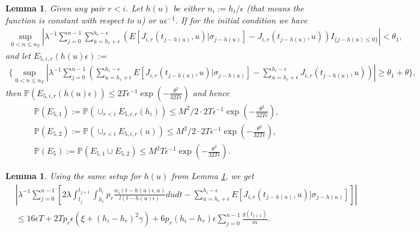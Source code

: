 \documentclass[12pt]{article}
\def\P{\mathbb{P}}
\numberwithin{equation}{section}  %
\newtheorem{lem}[thm]{Lemma}
\begin{document}
\begin{lem}\label{k_dw1} %
Given any pair $r<i$. Let $h(u)$ be either $n_i:=h_i/\epsilon$ (that means the function is constant with respect to $u$) or $u\epsilon^{-1}$.
If for the initial condition we have 
\begin{align}
\sup_{0<n\leq n_T}\left|\lambda^{-1}\sum_{j=0}^{n-1}
\sum_{u=h_r+\epsilon}^{h_i-\epsilon}\left(E[J_{i,r}(t_{j-h(u)},u)|\sigma_{j-h(u)}]
-J_{i,r}(t_{j-h(u)},u)
\right)I_{\{j-h(u)\leq 0\}}
\right|
<\theta_1 \label{kchoice_ini_eq4},
\end{align}
and let 
$E_{5,i,r}(h(u)\epsilon):=$
{\footnotesize
\begin{align*}
\Bigg\{\sup_{0<n\leq n_T}\left|\lambda^{-1}\sum_{j=0}^{n-1}\left(
\sum_{u=h_r+\epsilon}^{h_i-\epsilon}E[J_{i,r}(t_{j-h(u)},u)|\sigma_{j-h(u)}]
-\sum_{u=h_r+\epsilon}^{h_i-\epsilon}J_{i,r}(t_{j-h(u)},u)
\right)
\right|
\geq\theta_1+\theta\Bigg\},
\end{align*} }
then $\P(E_{5,i,r}(h(u)\epsilon))\leq 2T\epsilon^{-1}\exp\left(-\frac{\theta^2}{32T\epsilon}\right)$ and hence
{\footnotesize
\begin{align*} 
\P(E_{5,1}):=\P(\cup_{r<i}E_{5,i,r}(h_i))
\leq M^2/2\cdot2T\epsilon^{-1}\exp\left(-\frac{\theta^2}{32T\epsilon}\right),\\
\P(E_{5,2}):=\P(\cup_{r<i}E_{5,i,r}(u))
\leq M^2/2\cdot2T\epsilon^{-1}\exp\left(-\frac{\theta^2}{32T\epsilon}\right),\\
\P(E_5):=\P(E_{5,1}\cup E_{5,2})\leq M^2T\epsilon^{-1}\exp\left(-\frac{\theta^2}{32T\epsilon}\right).
\end{align*} }
\end{lem}

\begin{lem}\label{k_dw2} %
Using the same setup for $h(u)$ from Lemma \ref{k_dw1}, we get
\begin{align*}
&\left|
\lambda^{-1}\sum_{j=0}^{n-1}\left[
2\lambda\int_{t_j}^{t_{j+1}}\int_{h_r}^{h_i}p_r\frac{w_i(t-h(u)\epsilon,u)}{l(t-h(u)\epsilon)}dudt-\sum_{u=h_r+\epsilon}^{h_i-\epsilon}E[J_{i,r}(t_{j-h(u)},u)|\sigma_{j-h(u)}]\right]
\right|\\
&\leq16\epsilon T+2Tp_r\epsilon(\xi+(h_i-h_r)^2\gamma)+6p_r(h_i-h_r)\epsilon \sum_{j=0}^{n-1}\frac{g(t_{j+1})}{m}.
\end{align*}
\end{lem}
\end{document}
